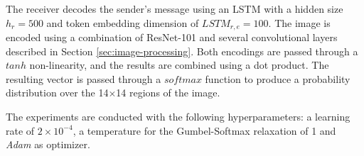 \documentclass[11pt,a4paper]{article}
\begin{document}
The receiver decodes the sender's message using an LSTM with a hidden size $h_r=500$ and token embedding dimension of $LSTM_{r,e}=100$.
The image is encoded using a combination of ResNet-101 and several convolutional layers described in Section \ref{sec:image-processing}.
Both encodings are passed through a $tanh$ non-linearity, and the results are combined using a dot product.
The resulting vector is passed through a $softmax$ function to produce a probability distribution over the 14$\times$14 regions of the image.

The experiments are conducted with the following hyperparameters: a learning rate of $2\times10^{-4}$, a temperature for the Gumbel-Softmax relaxation of 1 and \emph{Adam} \citep{Kingma2015} as optimizer.
\end{document}
